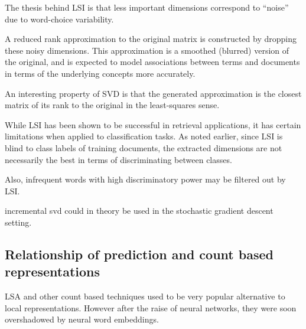         The thesis behind LSI is that less important dimensions correspond to “noise” due to word-choice variability.
        
        A reduced rank approximation to the original matrix is constructed by dropping these noisy dimensions. 
        This approximation is a smoothed (blurred) version of the original, 
        and is expected to model associations between terms and documents in terms of the underlying concepts more accurately.
         
        An interesting property of SVD is that the generated approximation is the closest matrix of its rank to the original in the least-squares sense.
        
        While LSI has been shown to be successful in retrieval applications, 
        it has certain limitations when applied to classification tasks. 
        As noted earlier, since LSI is blind to class labels of training documents, 
        the extracted dimensions are not necessarily the best in terms of discriminating between classes.
        
        Also, infrequent words with high discriminatory power may be filtered out by LSI. 
        
        
        
        \cite{papadimitriou2000latent} %
        \cite{deerwester1990indexing} %

        \cite{maas2011learning} %
        \cite{baroni2014don} %
        \cite{wiemer2004latent} %
        \cite{landauer1998introduction} %


        
        {}
        
        
        \cite{halko2011finding} %
        \cite{brand2006fast} %
        incremental svd could in theory be used in the stochastic gradient descent setting.


        \subsection{Relationship of prediction and count based representations}
            
            LSA and other count based techniques used to be very popular alternative to local representations.
            However after the raise of neural networks, they were soon overshadowed by neural word embeddings.
            
